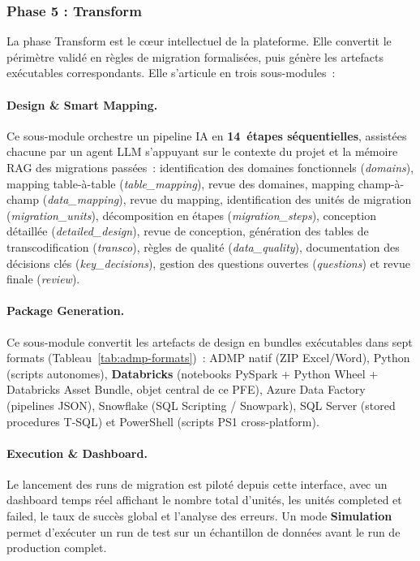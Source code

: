 \subsubsection*{Phase 5 : Transform}
\label{subsubsec:phase-transform}

La phase Transform est le cœur intellectuel de la plateforme. Elle convertit le périmètre validé en règles de migration formalisées, puis génère les artefacts exécutables correspondants. Elle s'articule en trois sous-modules~:

\paragraph{Design \& Smart Mapping.}
Ce sous-module orchestre un pipeline IA en \textbf{14~étapes séquentielles}, assistées chacune par un agent LLM s'appuyant sur le contexte du projet et la mémoire RAG des migrations passées~: identification des domaines fonctionnels (\textit{domains}), mapping table-à-table (\textit{table\_mapping}), revue des domaines, mapping champ-à-champ (\textit{data\_mapping}), revue du mapping, identification des unités de migration (\textit{migration\_units}), décomposition en étapes (\textit{migration\_steps}), conception détaillée (\textit{detailed\_design}), revue de conception, génération des tables de transcodification (\textit{transco}), règles de qualité (\textit{data\_quality}), documentation des décisions clés (\textit{key\_decisions}), gestion des questions ouvertes (\textit{questions}) et revue finale (\textit{review}).

\paragraph{Package Generation.}
Ce sous-module convertit les artefacts de design en bundles exécutables dans sept formats (Tableau~\ref{tab:admp-formats})~: ADMP natif (ZIP Excel/Word), Python (scripts autonomes), \textbf{Databricks} (notebooks PySpark + Python Wheel + Databricks Asset Bundle, objet central de ce PFE), Azure Data Factory (pipelines JSON), Snowflake (SQL Scripting / Snowpark), SQL Server (stored procedures T-SQL) et PowerShell (scripts PS1 cross-platform).

\paragraph{Execution \& Dashboard.}
Le lancement des runs de migration est piloté depuis cette interface, avec un dashboard temps réel affichant le nombre total d'unités, les unités completed et failed, le taux de succès global et l'analyse des erreurs. Un mode \textbf{Simulation} permet d'exécuter un run de test sur un échantillon de données avant le run de production complet.

